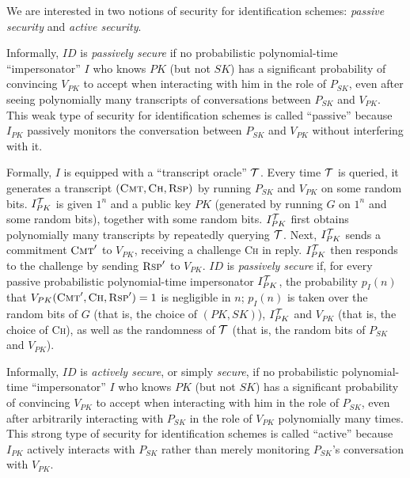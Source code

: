We are interested in two notions of security for identification
schemes: {\it passive security} and {\it active security}.

Informally, $ID$ is {\it passively secure} if no probabilistic polynomial-time
``impersonator'' $I$ who knows $PK$ (but not $SK$)
has a 
significant probability of convincing $V_{PK}$ to accept when interacting with
him in the role of $P_{SK}$, even after seeing polynomially many transcripts
of conversations between $P_{SK}$ and $V_{PK}$. This weak type of security for
identification schemes is called ``passive'' because $I_{PK}$ passively
monitors the conversation between $P_{SK}$ and $V_{PK}$ without interfering
with it.   

Formally, $I$ is equipped with a ``transcript oracle'' $\mathcal{T}$. Every time
$\mathcal{T}$ is queried, it generates a transcript
$(\textsc{Cmt},\textsc{Ch},\textsc{Rsp})$ by running $P_{SK}$ and $V_{PK}$ on
some random bits. $I_{PK}^{\mathcal{T}}$ is given $1^n$ and a public key $PK$
(generated by running $G$ on $1^n$ and some random bits), together with some
random bits.  $I_{PK}^{\mathcal{T}}$ first obtains polynomially many transcripts by
repeatedly querying $\mathcal{T}$. Next, $I_{PK}^{\mathcal{T}}$ sends a commitment
$\textsc{Cmt}'$ to $V_{PK}$, receiving a challenge \textsc{Ch} in reply.
$I_{PK}^{\mathcal{T}}$ then responds to the challenge by sending $\textsc{Rsp}'$ to
$V_{PK}$. $ID$ is {\it passively secure} if, for every passive probabilistic
polynomial-time impersonator $I_{PK}^{\mathcal{T}}$, the probability $p_I(n)$ that
$V_{PK}(\textsc{Cmt}',\textsc{Ch},\textsc{Rsp}') = 1$ is negligible in $n$;
$p_I(n)$ is taken over the random bits of $G$ (that is, the choice of
$(PK,SK)$), $I_{PK}^{\mathcal{T}}$ and $V_{PK}$ (that is, the choice of \textsc{Ch}),
as well as the randomness of $\mathcal{T}$ (that is, the random bits of $P_{SK}$ and
$V_{PK}$).

Informally, $ID$ is {\it actively secure}, or simply {\it secure}, if no
probabilistic polynomial-time ``impersonator'' $I$ who knows $PK$ (but not
$SK$)
has a significant probability of convincing $V_{PK}$ to accept when
interacting with him in the role of $P_{SK}$, even after arbitrarily
interacting with $P_{SK}$ in the role of $V_{PK}$ polynomially many times.
This strong type of security for identification schemes is called ``active''
because $I_{PK}$ actively interacts with $P_{SK}$ rather than merely
monitoring $P_{SK}$'s conversation with $V_{PK}$. 

